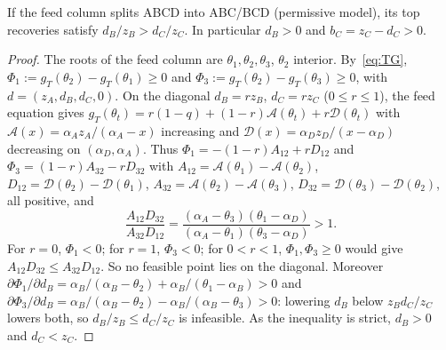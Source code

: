 \documentclass[11pt,a4paper]{report}
\begin{document}
\begin{lemma}\label{lem:recovery}
If the feed column splits ABCD into ABC/BCD (permissive model), its top recoveries satisfy $d_B/z_B>d_C/z_C$. In
particular $d_B>0$ and $b_C=z_C-d_C>0$.
\end{lemma}
\begin{proof}
The roots of the feed column are $\theta_1,\theta_2,\theta_3$, $\theta_2$ interior. By~\eqref{eq:TG},
$\Phi_1:=g_T(\theta_2)-g_T(\theta_1)\ge0$ and $\Phi_3:=g_T(\theta_2)-g_T(\theta_3)\ge0$, with $d=(z_A,d_B,d_C,0)$.
On the diagonal $d_B=rz_B$, $d_C=rz_C$ ($0\le r\le1$), the feed equation gives
$g_T(\theta_t)=r(1-q)+(1-r)\mathcal A(\theta_t)+r\mathcal D(\theta_t)$ with $\mathcal A(x)=\alpha_Az_A/(\alpha_A-x)$ increasing and
$\mathcal D(x)=\alpha_Dz_D/(x-\alpha_D)$ decreasing on $(\alpha_D,\alpha_A)$. Thus $\Phi_1=-(1-r)A_{12}+rD_{12}$ and
$\Phi_3=(1-r)A_{32}-rD_{32}$ with $A_{12}=\mathcal A(\theta_1)-\mathcal A(\theta_2)$, $D_{12}=\mathcal D(\theta_2)-\mathcal D(\theta_1)$,
$A_{32}=\mathcal A(\theta_2)-\mathcal A(\theta_3)$, $D_{32}=\mathcal D(\theta_3)-\mathcal D(\theta_2)$, all positive, and
\[\frac{A_{12}D_{32}}{A_{32}D_{12}}=\frac{(\alpha_A-\theta_3)(\theta_1-\alpha_D)}{(\alpha_A-\theta_1)(\theta_3-\alpha_D)}>1 .\]
For $r=0$, $\Phi_1<0$; for $r=1$, $\Phi_3<0$; for $0<r<1$, $\Phi_1,\Phi_3\ge0$ would give $A_{12}D_{32}\le A_{32}D_{12}$. So no
feasible point lies on the diagonal. Moreover $\partial\Phi_1/\partial d_B=\alpha_B/(\alpha_B-\theta_2)+\alpha_B/(\theta_1-\alpha_B)>0$ and
$\partial\Phi_3/\partial d_B=\alpha_B/(\alpha_B-\theta_2)-\alpha_B/(\alpha_B-\theta_3)>0$: lowering $d_B$ below $z_Bd_C/z_C$ lowers both, so
$d_B/z_B\le d_C/z_C$ is infeasible. As the inequality is strict, $d_B>0$ and $d_C<z_C$.
\end{proof}
\end{document}
